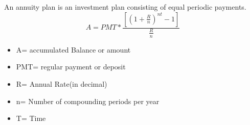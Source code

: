 \documentclass{article}
\begin{document}
	An annuity plan is an investment plan consisting of equal periodic payments.
	\begin{equation}
	A = PMT*\frac{[(1+\frac{R}{n})^{nt}-1]}{\frac{R}{n}}
	\end{equation}
	\begin{itemize}
		\item A= accumulated Balance or amount
		\item PMT= regular payment or deposit
		\item R= Annual Rate(in decimal)
		\item n= Number of compounding periods per year
		\item T= Time
	\end{itemize}
\end{document}
